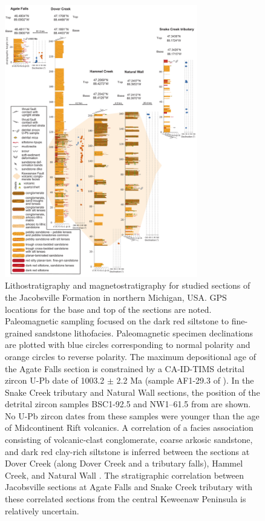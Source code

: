 \documentclass[draft]{agujournal2019}
\begin{document}
\begin{figure}[h!]
\centering
\includegraphics[width=0.75\textwidth]{Jacobsville_Sections_v6.pdf}
\caption{Lithostratigraphy and magnetostratigraphy for studied sections of the Jacobsville Formation in northern Michigan, USA. GPS locations for the base and top of the sections are noted. Paleomagnetic sampling focused on the dark red siltstone to fine-grained sandstone lithofacies. Paleomagnetic specimen declinations are plotted with blue circles corresponding to normal polarity and orange circles to reverse polarity. The maximum depositional age of the Agate Falls section is constrained by a CA-ID-TIMS detrital zircon U-Pb date of 1003.2 $\pm$ 2.2 Ma (sample AF1-29.3 of ). In the Snake Creek tributary and Natural Wall sections, the position of the detrital zircon samples BSC1-92.5 and NW1–61.5 from  are shown. No U-Pb zircon dates from these samples were younger than the age of Midcontinent Rift volcanics. A correlation of a facies association consisting of volcanic-clast conglomerate, coarse arkosic sandstone, and dark red clay-rich siltstone is inferred between the sections at Dover Creek (along Dover Creek and a tributary falls), Hammel Creek, and Natural Wall \cite{Brojanigo1984a}. The stratigraphic correlation between Jacobsville sections at Agate Falls and Snake Creek tributary with these correlated sections from the central Keweenaw Peninsula is relatively uncertain.}
\label{fig:strat_column}
\end{figure}
\end{document}

